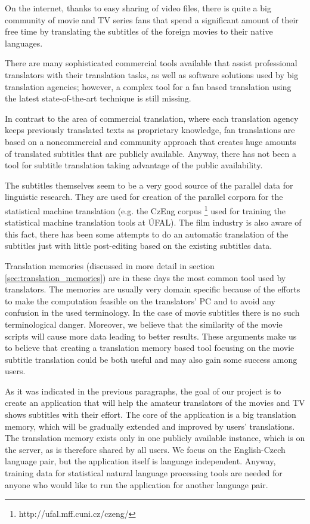 On the internet, thanks to easy sharing of video files, there is quite a big community of movie and TV series fans that spend a significant amount of their free time by translating the subtitles of the foreign movies to their native languages. 


There are many sophisticated commercial tools available that assist professional translators with their translation tasks, as well as software solutions used by big translation agencies; however, a complex tool for a fan based translation using the latest state-of-the-art technique is still missing. 

In contrast to the area of commercial translation, where each translation agency keeps previously translated texts as proprietary knowledge, fan translations are based on a noncommercial and  community approach that creates huge amounts of translated subtitles that are publicly available. Anyway, there has not been a tool for subtitle translation taking advantage of the public availability.

The subtitles themselves seem to be a very good source of the parallel data for linguistic research. They are used for creation of the parallel corpora for the statistical machine translation (e.g. the CzEng corpus \footnote{http://ufal.mff.cuni.cz/czeng/} used for training the statistical machine translation tools at ÚFAL). The film industry is also aware of this fact, there has been some attempts to do an automatic translation of the subtitles just with little post-editing based on the existing subtitles data.

Translation memories (discussed in more detail in section \ref{sec:translation_memories}) are in these days the most common tool used by translators. The memories are usually very domain specific because of the efforts to make the computation feasible on the translators' PC and to avoid any confusion in the used terminology. In the case of movie subtitles there is no such terminological danger. Moreover, we believe that the similarity of the movie scripts will cause more data leading to better results. These arguments make us to believe that creating a translation memory based tool focusing on the movie subtitle translation could be both useful and may also gain some success among users.

As it was indicated in the previous paragraphs, the goal of our project is to create an application that will help the amateur translators of the movies and TV shows subtitles with their effort. The core of the application is a big translation memory, which will be gradually extended and improved by users' translations. The translation memory exists only in one publicly available instance, which is on the server, as is therefore shared by all users. We focus on the English-Czech language pair, but the application itself is language independent. Anyway, training data for statistical natural language processing tools are needed for anyone who would like to run the application for another language pair.

